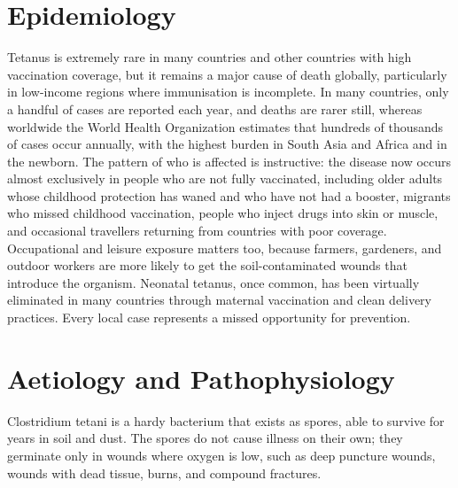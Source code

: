 \section*{Epidemiology}
Tetanus is extremely rare in many countries and other countries with high vaccination coverage, but it remains a major cause of death globally, particularly in low-income regions where immunisation is incomplete. In many countries, only a handful of cases are reported each year, and deaths are rarer still, whereas worldwide the World Health Organization estimates that hundreds of thousands of cases occur annually, with the highest burden in South Asia and Africa and in the newborn. The pattern of who is affected is instructive: the disease now occurs almost exclusively in people who are not fully vaccinated, including older adults whose childhood protection has waned and who have not had a booster, migrants who missed childhood vaccination, people who inject drugs into skin or muscle, and occasional travellers returning from countries with poor coverage. Occupational and leisure exposure matters too, because farmers, gardeners, and outdoor workers are more likely to get the soil-contaminated wounds that introduce the organism. Neonatal tetanus, once common, has been virtually eliminated in many countries through maternal vaccination and clean delivery practices. Every local case represents a missed opportunity for prevention.

\section*{Aetiology and Pathophysiology}
Clostridium tetani is a hardy bacterium that exists as spores, able to survive for years in soil and dust. The spores do not cause illness on their own; they germinate only in wounds where oxygen is low, such as deep puncture wounds, wounds with dead tissue, burns, and compound fractures.

